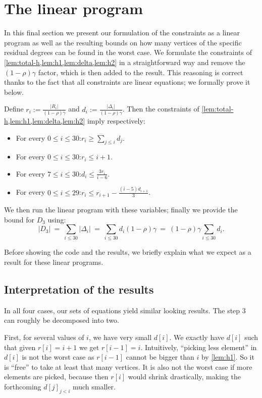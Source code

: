 
\section{The linear program}\label{sec:linear-prog}

In this final section we present our formulation of the constraints as a
linear program as well as the resulting bounds on how many vertices of
the specific residual degrees can be found in the worst case.
We formulate the constraints of \cref{lem:total-h,lem:h1,lem:delta,lem:h2} in a
straightforward way and remove the
$(1-\rho)\gamma$ factor, which is then added to the result.
%
This reasoning is correct thanks to the fact that all constraints are linear
equations; we formally prove it below.

\smallskip
Define $r_i := \frac{|R_i|}{(1-\rho)\gamma}$ and
$d_i:=\frac{|\Delta_i|}{(1-\rho)\gamma}$.
Then the constraints of \cref{lem:total-h,lem:h1,lem:delta,lem:h2} imply respectively:
\begin{itemize}
  \item For every $0\le i\le 30$:\quad $r_i \ge \sum\limits_{j\le i} d_j$.\\ \smallskip
  \item For every $0\le i\le 30$:\quad $r_i \le i+1$.\\ \smallskip
  \item For every $7\le i\le 30$:\quad $d_i \le \frac{3 r_i}{i-6}$.\\ \smallskip
  \item For every $0\le i\le 29$:\quad $r_i \le r_{i+1} - \frac{(i-5)d_{i+1}}{3}$.
\end{itemize}

We then run the linear program with these variables; finally we provide the bound for $D_3$ using:
\[|D_3| ~=~ \sum\limits_{i\le 30} |\Delta_i|
~=~ \sum\limits_{i\le 30} d_i(1-\rho)\gamma
~=~ (1-\rho)\gamma\sum\limits_{i\le 30}d_i.\]

Before showing the code and the results, we briefly explain what we expect as a
result for these linear programs.

\subsection{Interpretation of the results}
In all four cases, our sets of equations yield similar looking results.
The step $3$ can roughly be decomposed into two.

First, for several values of
$i$, we have very small $d[i]$. We exactly have $d[i]$ such that
given $r[i]=i+1$ we get $r[i-1]=i$. Intuitively, ``picking less element'' in $d[i]$
is not the worst case as $r[i-1]$ cannot be bigger than $i$ by \cref{lem:h1}.
So it is ``free'' to take at least that many vertices.
It is also not the worst case if more elements are picked, because then $r[i]$
would shrink drastically, making the forthcoming $d[j]_{j<i}$ much smaller.

